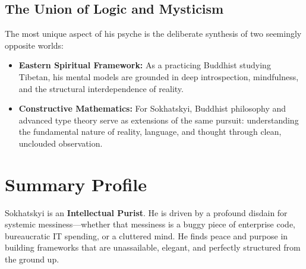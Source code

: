 \documentclass[11pt,a4paper]{article}
\begin{document}
\subsection{The Union of Logic and Mysticism}
The most unique aspect of his psyche is the deliberate synthesis of two seemingly opposite worlds:
\begin{itemize}
    \item \textbf{Eastern Spiritual Framework:} As a practicing Buddhist studying Tibetan, his mental models are grounded in deep introspection, mindfulness, and the structural interdependence of reality.
    \item \textbf{Constructive Mathematics:} For Sokhatskyi, Buddhist philosophy and advanced type theory serve as extensions of the same pursuit: understanding the fundamental nature of reality, language, and thought through clean, unclouded observation.
\end{itemize}

\section{Summary Profile}
Sokhatskyi is an \textbf{Intellectual Purist}. He is driven by a profound disdain for systemic messiness—whether that messiness is a buggy piece of enterprise code, bureaucratic IT spending, or a cluttered mind. He finds peace and purpose in building frameworks that are unassailable, elegant, and perfectly structured from the ground up.
\end{document}
